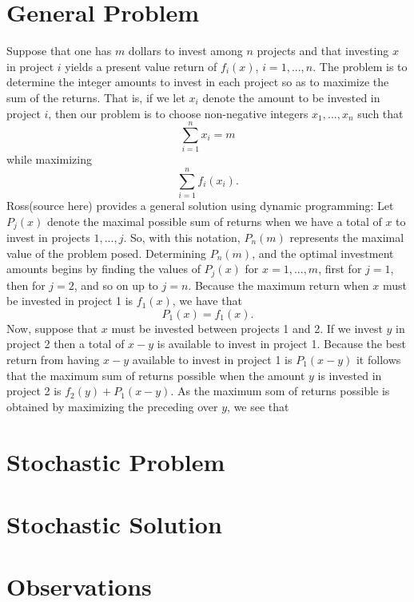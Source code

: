 \documentclass{article}
\begin{document}
\section{General Problem}
Suppose that one has $m$ dollars to invest among $n$ projects and that investing $x$ in project $i$ yields a present value return of $f_{i}(x)$, $i = 1, ..., n$. The problem is to determine the integer amounts to invest in each project so as to maximize the sum of the returns.  That is, if we let $x_{i}$ denote the amount to be invested in project $i$, then our problem is to choose non-negative integers $x_{1}, ..., x_{n}$ such that $$\sum_{i=1}^{n}x_{i} = m$$ while maximizing $$\sum_{i=1}^{n} f_{i}(x_{i}).$$ Ross(source here) provides a general solution using dynamic programming:
\linebreak
Let $P_{j}(x)$ denote the maximal possible sum of returns when we have a total of $x$ to invest in projects $1, ..., j$. So, with this notation, $P_{n}(m)$ represents the maximal value of the problem posed. Determining $P_{n}(m)$, and the optimal investment amounts begins by finding the values of $P_{j}(x)$ for $x = 1, ..., m$, first for $j = 1$, then for $j=2$, and so on up to $j=n$.
\linebreak
Because the maximum return when $x$ must be invested in project 1 is $f_{1}(x)$, we have that $$P_{1}(x) = f_{1}(x).$$
Now, suppose that $x$ must be invested between projects 1 and 2. If we invest $y$ in project 2 then a total of $x-y$ is available to invest in project 1. Because the best return from having $x-y$ available to invest in project 1 is $P_{1}(x-y)$ it follows that the maximum sum of returns possible when the amount $y$ is invested in project 2 is $f_{2}(y) + P_{1}(x-y).$ As the maximum som of returns possible is obtained by maximizing the preceding over $y$, we see that 


\section{Stochastic Problem}

\section{Stochastic Solution}

\section{Observations}
\end{document}
